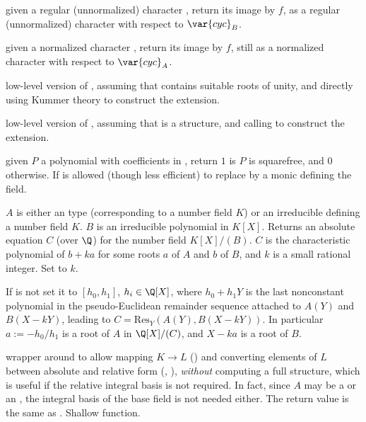  given a regular (unnormalized)
character , return its image by $f$, as a regular (unnormalized)
character with respect to $\var{cyc}_B$.

 given a normalized character
, return its image by $f$, still as a normalized character
with respect to $\var{cyc}_A$.


low-level version of , assuming that  contains
suitable roots of unity, and directly using Kummer theory to construct the
extension.

low-level version of , assuming that  is a
 structure, and calling  to construct the extension.


 given $P$ a polynomial with
coefficients in , return $1$ is $P$ is squarefree, and $0$
otherwise. If is allowed (though less efficient) to replace 
by a monic  defining the field.

 $A$ is either an
 type (corresponding to a number field $K$) or an irreducible 
defining a number field $K$. $B$ is an irreducible polynomial in $K[X]$.
Returns an absolute equation $C$ (over $\Q$) for the number field $K[X]/(B)$.
$C$ is the characteristic polynomial of $b + k a$ for some roots $a$ of $A$
and $b$ of $B$, and $k$ is a small rational integer. Set  to $k$.

If  is not  set it to $[h_0, h_1]$, $h_i\in \Q[X]$,
where $h_0+h_1 Y$ is the last nonconstant polynomial in the pseudo-Euclidean
remainder sequence attached to $A(Y)$ and $B(X-kY)$, leading to $C =
\text{Res}_Y(A(Y), B(X-kY))$. In particular $a := -h_0/h_1$ is a root of $A$
in $\Q[X]/(C)$, and $X - ka$ is a root of $B$.

 wrapper around  to allow
mapping $K\to L$ () and converting elements of $L$
between absolute and relative form (, ),
\emph{without} computing a full  structure, which is useful if the
relative integral basis is not required. In fact, since $A$ may be a 
or an , the integral basis of the base field is not needed either. The
return value is the same as . Shallow function.

